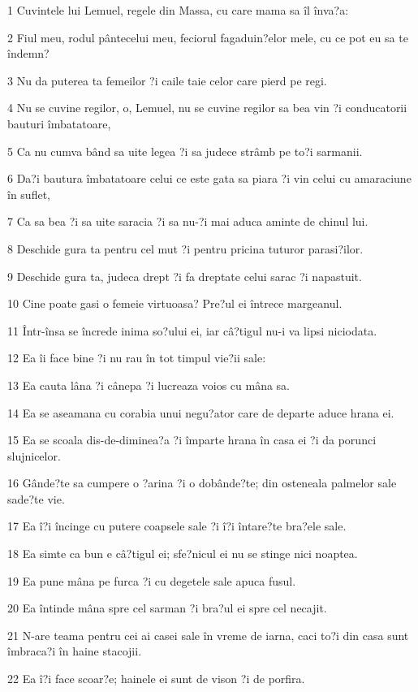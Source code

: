 \par 1 Cuvintele lui Lemuel, regele din Massa, cu care mama sa îl înva?a:
\par 2 Fiul meu, rodul pântecelui meu, feciorul fagaduin?elor mele, cu ce pot eu sa te îndemn?
\par 3 Nu da puterea ta femeilor ?i caile taie celor care pierd pe regi.
\par 4 Nu se cuvine regilor, o, Lemuel, nu se cuvine regilor sa bea vin ?i conducatorii bauturi îmbatatoare,
\par 5 Ca nu cumva bând sa uite legea ?i sa judece strâmb pe to?i sarmanii.
\par 6 Da?i bautura îmbatatoare celui ce este gata sa piara ?i vin celui cu amaraciune în suflet,
\par 7 Ca sa bea ?i sa uite saracia ?i sa nu-?i mai aduca aminte de chinul lui.
\par 8 Deschide gura ta pentru cel mut ?i pentru pricina tuturor parasi?ilor.
\par 9 Deschide gura ta, judeca drept ?i fa dreptate celui sarac ?i napastuit.
\par 10 Cine poate gasi o femeie virtuoasa? Pre?ul ei întrece margeanul.
\par 11 Într-însa se încrede inima so?ului ei, iar câ?tigul nu-i va lipsi niciodata.
\par 12 Ea îi face bine ?i nu rau în tot timpul vie?ii sale:
\par 13 Ea cauta lâna ?i cânepa ?i lucreaza voios cu mâna sa.
\par 14 Ea se aseamana cu corabia unui negu?ator care de departe aduce hrana ei.
\par 15 Ea se scoala dis-de-diminea?a ?i împarte hrana în casa ei ?i da porunci slujnicelor.
\par 16 Gânde?te sa cumpere o ?arina ?i o dobânde?te; din osteneala palmelor sale sade?te vie.
\par 17 Ea î?i încinge cu putere coapsele sale ?i î?i întare?te bra?ele sale.
\par 18 Ea simte ca bun e câ?tigul ei; sfe?nicul ei nu se stinge nici noaptea.
\par 19 Ea pune mâna pe furca ?i cu degetele sale apuca fusul.
\par 20 Ea întinde mâna spre cel sarman ?i bra?ul ei spre cel necajit.
\par 21 N-are teama pentru cei ai casei sale în vreme de iarna, caci to?i din casa sunt îmbraca?i în haine stacojii.
\par 22 Ea î?i face scoar?e; hainele ei sunt de vison ?i de porfira.
